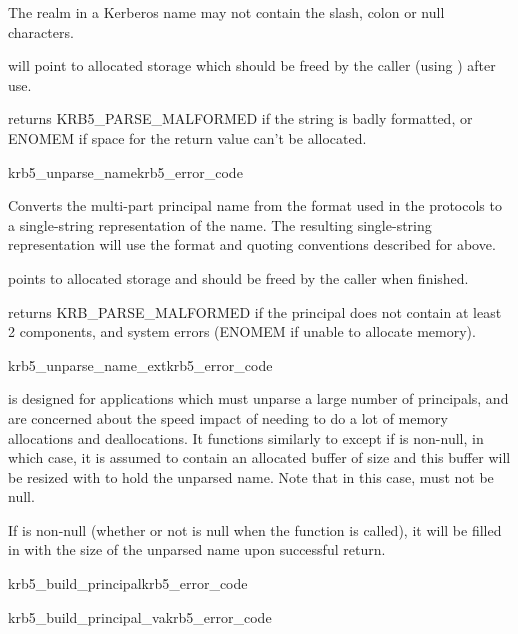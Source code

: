 The realm in a Kerberos name may not contain the slash, colon or null
characters.

 will point to allocated storage which should be freed by
the caller (using ) after use.

 returns KRB5_PARSE_MALFORMED if the string is
 badly formatted, or ENOMEM if space for the return value can't be
allocated.

\begin{funcdecl}{krb5_unparse_name}{krb5_error_code}{\funcin}
\funcout
{}
\end{funcdecl}

Converts the multi-part principal name  from the
format used in the protocols to a single-string representation of the
name.  The resulting single-string representation will use the format
and quoting conventions described for 
above.

 points to allocated storage and should be freed by the caller
when finished.

 returns KRB_PARSE_MALFORMED if the principal
does not contain at least 2 components, and system errors (ENOMEM if
unable to allocate memory).

\begin{funcdecl}{krb5_unparse_name_ext}{krb5_error_code}{\funcin}
\funcinout
{}
\end{funcdecl}

 is designed for applications which
must unparse a large number of principals, and are concerned about the
speed impact of needing to do a lot of memory allocations and
deallocations.  It functions similarly to 
except if  is non-null, in which case, it is assumed
to contain an allocated buffer of size  and this
buffer will be resized with  to hold the unparsed
name.  Note that in this case,
 must not be null.  

If  is non-null (whether or not  is
null when the function is called), it will be filled in with the size
of the unparsed name upon successful return.

\begin{funcdecl}{krb5_build_principal}{krb5_error_code}{\funcout}
\funcin
{}
\end{funcdecl}
\begin{funcdecl}{krb5_build_principal_va}{krb5_error_code}{\funcout}
\funcin
{}
\end{funcdecl}

